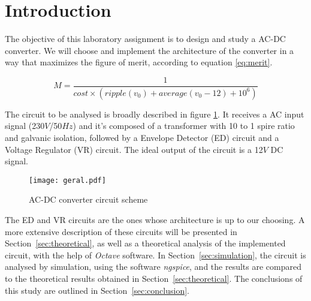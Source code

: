 \section{Introduction}
\label{sec:introduction}

\par The objective of this laboratory assignment is to design and study a AC-DC converter. We will choose and implement the architecture of the converter in a way that maximizes the figure of merit, according to equation \ref{eq:merit}.

\begin{equation}
    M = \frac{1}{cost \times (ripple(v_0) + average (v_0 - 12) + 10^6)}
    \label{eq:merit}
\end{equation}

The circuit to be analysed is broadly described in figure \ref{fig:circuit}. It receives a AC input signal (230$V$/50$Hz$) and it's composed of a transformer with 10 to 1 spire ratio and galvanic isolation, followed by a Envelope Detector (ED) circuit and a Voltage Regulator (VR) circuit. The ideal output of the circuit is a 12$V$ DC signal. 

\begin{figure}[H]   
\centering
\texttt{[image: geral.pdf]}
\caption{AC-DC converter circuit scheme}
\label{fig:circuit}
\end{figure}

\par The ED and VR circuits are the ones whose architecture is up to our choosing. A more extensive description of these circuits will be presented in Section~\ref{sec:theoretical}, as well as a theoretical analysis of the implemented circuit, with the help of \textit{Octave} software. In Section~\ref{sec:simulation}, the circuit is analysed by simulation, using the software \textit{ngspice}, and the results are compared to the theoretical results obtained in Section~\ref{sec:theoretical}. The conclusions of this study are outlined in Section~\ref{sec:conclusion}.